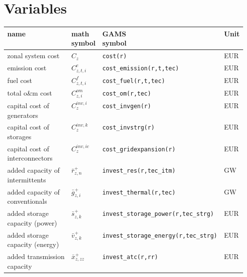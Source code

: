 \documentclass[11pt,a4paper]{article}
\begin{document}
\section{Variables} \label{variables}
\begin{tabular}{l l l l}
\textbf{name} & \makecell[l]{\textbf{math} \\ \textbf{symbol}} & \makecell[l]{\textbf{GAMS} \\\textbf{symbol}} & \textbf{Unit} \\
\hline \hline
zonal system cost & $C_{z}$ & \texttt{cost(r)} & EUR \\ \hline
emission cost & $C^{e}_{z,t,i}$ & \texttt{cost\_emission(r,t,tec)} & EUR \\ \hline
fuel cost & $C^{f}_{z,t,i}$ & \texttt{cost\_fuel(r,t,tec)} & EUR \\ \hline
total o\&m cost & $C^{om}_{z,i}$ & \texttt{cost\_om(r,tec)} & EUR \\ \hline
\makecell[l]{capital cost of \\generators} & $C_{z}^{inv,i}$ & \texttt{cost\_invgen(r)} & EUR \\ \hline
\makecell[l]{capital cost of \\storages} & $C_{z}^{inv,k}$ & \texttt{cost\_invstrg(r)} & EUR \\ \hline
\makecell[l]{capital cost of \\interconnectors} & $C_{z}^{inv,ic}$ & \texttt{cost\_gridexpansion(r)} & EUR \\ \hline
\makecell[l]{added capacity of \\intermittents} & $\bar{r}^{+}_{z,n}$ & \texttt{invest\_res(r,tec\_itm)} & GW \\ \hline
\makecell[l]{added capacity of \\conventionals} & $\bar{g}^{+}_{z,i}$ & \texttt{invest\_thermal(r,tec)} & GW \\ \hline
\makecell[l]{added storage \\capacity (power)} & $\bar{s}^{+}_{z,k}$ & \texttt{invest\_storage\_power(r,tec\_strg)} & EUR \\ \hline
\makecell[l]{added storage \\capacity (energy)} & $\bar{v}^{+}_{z,k}$ & \texttt{invest\_storage\_energy(r,tec\_strg)} & EUR \\ \hline
\makecell[l]{added transmission \\capacity} & $\bar{x}^{+}_{z,zz}$ & \texttt{invest\_atc(r,rr)} & EUR \\ \hline

\end{tabular}
\end{document}
